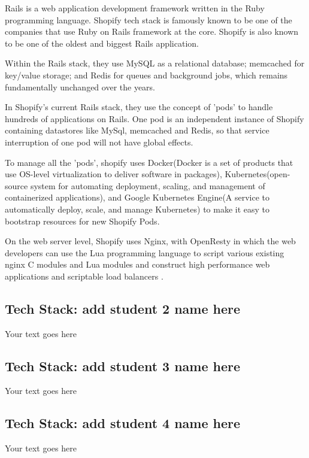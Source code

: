 \documentclass[a4paper, 11pt]{report}
\begin{document}
Rails is a web application development framework written in the Ruby programming language. Shopify tech stack is famously known to be one of the companies that use Ruby on Rails framework at the core. Shopify is also known to be one of the oldest and biggest Rails application. 

Within the Rails stack, they use MySQL as a relational database; memcached for key/value storage; and Redis for queues and background jobs, which remains fundamentally unchanged over the years.

In Shopify's current Rails stack, they use the concept of 'pods' to handle hundreds of applications on Rails. One pod is an independent instance of Shopify containing datastores like MySql, memcached and Redis, so that service interruption of one pod will not have global effects.

To manage all the 'pods', shopify uses Docker(Docker is a set of products that use OS-level virtualization to deliver software in packages), Kubernetes(open-source system for automating deployment, scaling, and management of containerized applications), and Google Kubernetes Engine(A service to automatically deploy, scale, and manage Kubernetes) to make it easy to bootstrap resources for new Shopify Pods.

On the web server level, Shopify uses Nginx, with OpenResty in which the web developers can use the Lua programming language to script various existing nginx C modules and Lua modules and construct high performance web applications and scriptable load balancers \cite{Shatrov2018}.

\subsection{Tech Stack: add student 2 name here}

Your text goes here

\subsection{Tech Stack: add student 3 name here}

Your text goes here

\subsection{Tech Stack: add student 4 name here}

Your text goes here


\end{document}

